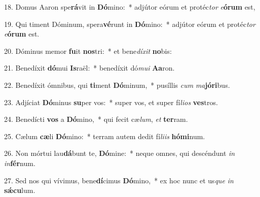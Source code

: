 18. Domus Aaron spe\textbf{rá}vit in \textbf{Dó}mino:~*  adjútor eórum et protéc\textit{tor} \textit{e}\textbf{ó}\textbf{rum} est,\

19. Qui timent Dóminum, spera\textbf{vé}runt in \textbf{Dó}mino:~*  adjútor eórum et protéc\textit{tor} \textit{e}\textbf{ó}\textbf{rum} est.\

20. Dóminus memor \textbf{fu}it \textbf{nos}tri:~*  et bene\textit{dí}\textit{xit} \textbf{no}bis:\

21. Benedíxit \textbf{dó}mui \textbf{Is}raël:~*  benedíxit dó\textit{mu}\textit{i} \textbf{A}\textbf{a}ron.\

22. Benedíxit ómnibus, qui \textbf{ti}ment \textbf{Dó}minum,~*  pusíllis \textit{cum} \textit{ma}\textbf{jó}\textbf{ri}bus.\

23. Adjíciat \textbf{Dó}minus \textbf{su}per vos:~*  super vos, et super fí\textit{li}\textit{os} \textbf{ves}tros.\

24. Benedícti \textbf{vos} a \textbf{Dó}mino,~*  qui fecit cæ\textit{lum}, \textit{et} \textbf{ter}ram.\

25. Cælum \textbf{cæ}li \textbf{Dó}mino:~*  terram autem dedit fí\textit{li}\textit{is} \textbf{hó}\textbf{mi}num.\

26. Non mórtui lau\textbf{dá}bunt te, \textbf{Dó}mine:~*  neque omnes, qui descéndunt \textit{in} \textit{in}\textbf{fér}num.\

27. Sed nos qui vívimus, bene\textbf{dí}cimus \textbf{Dó}mino,~*  ex hoc nunc et us\textit{que} \textit{in} \textbf{sǽ}\textbf{cu}lum.\

